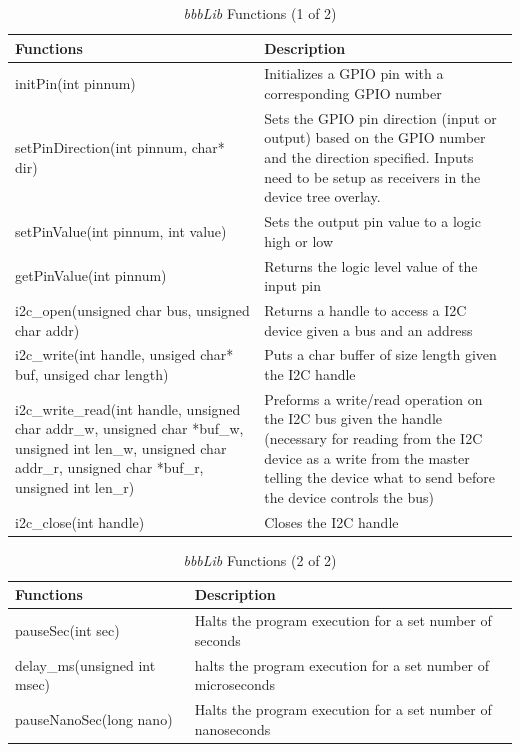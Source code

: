 \documentclass[12pt,oneside,final]{siuethesis}
\theoremstyle{definition}
\begin{document}
\begin{table}[!htb]
	\centering
    \begin{tabular}{ | p{7cm} | p{8cm}|}
    	\hline
	Functions & Description  \\ \hline
	initPin(int pinnum) & Initializes a GPIO pin with a corresponding GPIO number \\ \hline
	setPinDirection(int pinnum, char* dir) & Sets the GPIO pin direction (input or output) based on the GPIO number and the direction specified. Inputs need to be setup as receivers in the device tree overlay. \\ \hline
	setPinValue(int pinnum, int value) &  Sets the output pin value to a logic high or low\\ \hline
	getPinValue(int pinnum) & Returns the logic level value of the input pin\\ \hline
	i2c\_open(unsigned char bus, unsigned char addr) & Returns a handle to access a I2C device given a bus and an address\\ \hline
	i2c\_write(int handle, unsiged char* buf, unsiged char length) & Puts a char buffer of size length given the I2C handle\\ \hline
	i2c\_write\_read(int handle, unsigned char addr\_w, unsigned char *buf\_w, unsigned int len\_w, unsigned char addr\_r, unsigned char *buf\_r, unsigned int len\_r) & Preforms a write/read operation on the I2C bus given the handle (necessary for reading from the I2C device as a write from the master telling the device what to send before the device controls the bus) \\ \hline
	i2c\_close(int handle) & Closes the I2C handle\\ \hline    
    \end{tabular}
     \caption{\emph{bbbLib} Functions (1 of 2) }
 	\label{Tab:bbbLibFunctions1}
\end{table}

\begin{table}[!htb]
	\centering
	\begin{tabular}{|l|p{8cm}|}
		\hline
		Functions & Description \\ \hline
		pauseSec(int sec) & Halts the program execution for a set number of seconds \\ \hline
		delay\_ms(unsigned int msec) & halts the program execution for a set number of microseconds \\ \hline
		pauseNanoSec(long nano) & Halts the program execution for a set number of nanoseconds \\ \hline
	\end{tabular}
    \caption{\emph{bbbLib} Functions (2 of 2) }
 	\label{Tab:bbbLibFunctions2}
\end{table}
\end{document}
